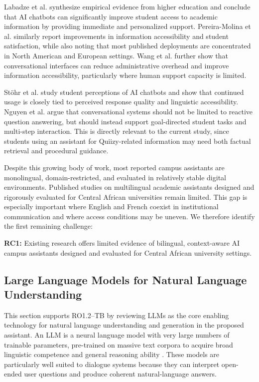 \documentclass[a4paper,9pt,twocolumn]{extarticle}
\begin{document}
Labadze et al. \cite{labadze2023} synthesize empirical evidence from
higher education and conclude that AI chatbots can significantly improve
student access to academic information by providing immediate and
personalized support. Pereira-Molina et al. \cite{pereira2023} similarly
report improvements in information accessibility and student
satisfaction, while also noting that most published deployments are
concentrated in North American and European settings. Wang et al.
\cite{wang2024} further show that conversational interfaces can reduce
administrative overhead and improve information accessibility,
particularly where human support capacity is limited.

St\"ohr et al. \cite{stoehr2024} study student perceptions of AI chatbots
and show that continued usage is closely tied to perceived response
quality and linguistic accessibility. Nguyen et al.
\cite{nguyenRoleDesign2023} argue that conversational systems should not
be limited to reactive question answering, but should instead support
goal-directed student tasks and multi-step interaction. This is directly
relevant to the current study, since students using an assistant for
Quiizy-related information may need both factual retrieval and procedural
guidance.

Despite this growing body of work, most reported campus assistants are
monolingual, domain-restricted, and evaluated in relatively stable
digital environments. Published studies on multilingual academic
assistants designed and rigorously evaluated for Central African
universities remain limited. This gap is especially important where
English and French coexist in institutional communication and where
access conditions may be uneven. We therefore identify the first
remaining challenge:

\textbf{RC1:} Existing research offers limited evidence of bilingual,
context-aware AI campus assistants designed and evaluated for Central
African university settings.

\subsection{Large Language Models for Natural Language Understanding}
\label{sec:soa:llm}

This section supports RO1.2--TB by reviewing LLMs as the core enabling
technology for natural language understanding and generation in the
proposed assistant. An LLM is a neural language model with very large
numbers of trainable parameters, pre-trained on massive text corpora to
acquire broad linguistic competence and general reasoning ability
\cite{zhao2023survey,brown2020language}. These models are particularly
well suited to dialogue systems because they can interpret open-ended
user questions and produce coherent natural-language answers.
\end{document}
